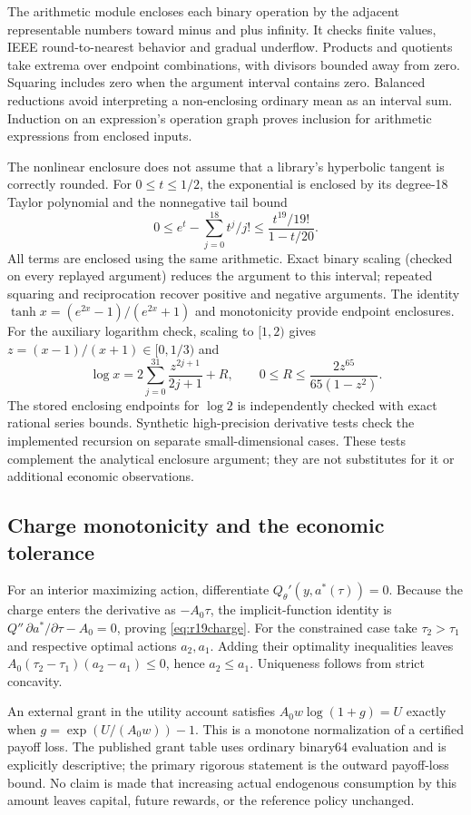 The arithmetic module encloses each binary operation by the adjacent
representable numbers toward minus and plus infinity. It checks finite
values, IEEE round-to-nearest behavior and gradual underflow. Products and
quotients take extrema over endpoint combinations, with divisors bounded
away from zero. Squaring includes zero when the argument interval contains
zero. Balanced reductions avoid interpreting a non-enclosing ordinary mean
as an interval sum. Induction on an expression's operation graph proves
inclusion for arithmetic expressions from enclosed inputs.

The nonlinear enclosure does not assume that a library's hyperbolic tangent
is correctly rounded. For $0\leq t\leq1/2$, the exponential is enclosed by
its degree-18 Taylor polynomial and the nonnegative tail bound
\[
 0\leq e^t-\sum_{j=0}^{18}t^j/j!
 \leq \frac{t^{19}/19!}{1-t/20}.
\]
All terms are enclosed using the same arithmetic. Exact binary scaling (checked on every replayed argument) reduces the
argument to this interval; repeated squaring and reciprocation recover
positive and negative arguments. The identity
$\tanh x=(e^{2x}-1)/(e^{2x}+1)$ and monotonicity provide endpoint enclosures.
For the auxiliary logarithm check, scaling to $[1,2)$ gives
$z=(x-1)/(x+1)\in[0,1/3)$ and
\[
 \log x=2\sum_{j=0}^{31}\frac{z^{2j+1}}{2j+1}+R,
 \qquad 0\leq R\leq\frac{2z^{65}}{65(1-z^2)}.
\]
The stored enclosing endpoints for $\log2$ is independently checked with
exact rational series bounds. Synthetic high-precision derivative tests
check the implemented recursion on separate small-dimensional cases.
These tests complement the analytical enclosure argument; they are not
substitutes for it or additional economic observations.

\subsection{Charge monotonicity and the economic tolerance}
For an interior maximizing action, differentiate
$Q_\theta'(y,a^*(\tau))=0$. Because the charge enters the derivative as
$-A_0\tau$, the implicit-function identity is
$Q''\,\partial a^*/\partial\tau-A_0=0$, proving
\eqref{eq:r19charge}. For the constrained case take $\tau_2>\tau_1$ and
respective optimal actions $a_2,a_1$. Adding their optimality inequalities
leaves
$A_0(\tau_2-\tau_1)(a_2-a_1)\leq0$, hence $a_2\leq a_1$.
Uniqueness follows from strict concavity.

An external grant in the utility account satisfies
$A_0w\log(1+g)=U$ exactly when $g=\exp(U/(A_0w))-1$. This is a
monotone normalization of a certified payoff loss. The published grant
table uses ordinary binary64 evaluation and is explicitly descriptive;
the primary rigorous statement is the outward payoff-loss bound. No claim
is made that increasing actual endogenous consumption by this amount leaves
capital, future rewards, or the reference policy unchanged.
